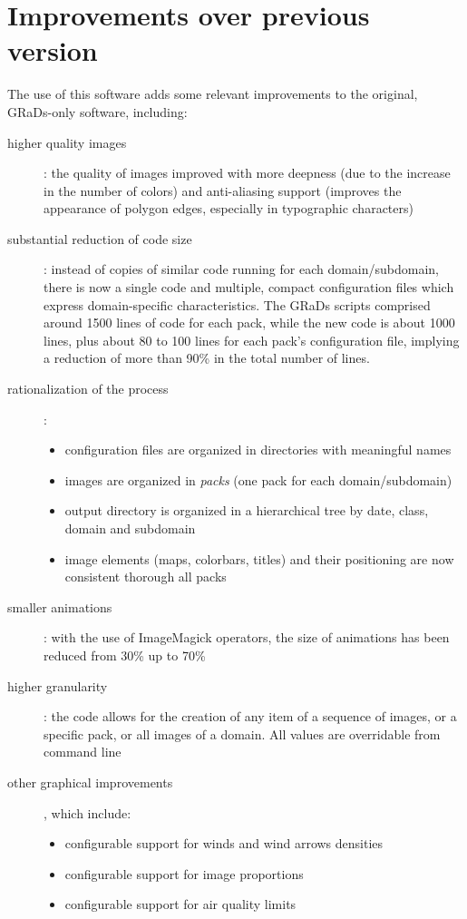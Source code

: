 \documentclass[11pt]{article}
\newcommand{\grads}{GRaDs}
\begin{document}
\section{Improvements over previous version}
The use of this software adds some relevant improvements to the original, \grads{}-only software, including: 
\begin{description}
\item[higher quality images]: the quality of images improved with more deepness (due to the increase in the number of colors) and anti-aliasing support (improves the appearance of polygon edges, especially in typographic characters)
\item[substantial reduction of code size]: instead of copies of similar code running for each domain/subdomain, there is now a single code and multiple, compact configuration files which express domain-specific characteristics. The \grads{} scripts comprised around 1500 lines of code for each pack, while the new code is about 1000 lines, plus about 80 to 100 lines for each pack's configuration file, implying a reduction of more than 90\% in the total number of lines. 

\item[rationalization of the process]: 
\begin{itemize}
\item configuration files are organized in directories with meaningful names
\item images are organized in \emph{packs} (one pack for each domain/subdomain)
\item output directory is organized in a hierarchical tree by date, class, domain and subdomain 
\item image elements (maps, colorbars, titles) and their positioning are now consistent thorough all packs 
\end{itemize}

\item[smaller animations]: with the use of ImageMagick operators, the size of animations has been reduced from 30\% up to 70\%

\item[higher granularity]: the code allows for the creation of any item of a sequence of images, or a specific pack, or all images of a domain. All values are overridable from command line
\item[other graphical improvements], which include: 
	\begin{itemize}
	\item configurable support for winds and wind arrows densities
	\item configurable support for image proportions 
	\item configurable support for air quality limits 
	\end{itemize}
\end{description}
\end{document}
